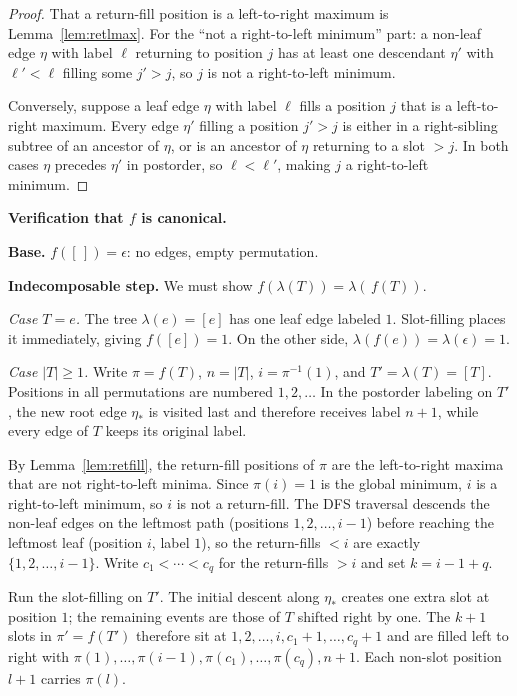 \documentclass[a4paper,11pt]{article}
\theoremstyle{definition}
\begin{document}
\begin{proof}
That a return-fill position is a left-to-right maximum
is Lemma~\ref{lem:retlmax}. For the ``not a
right-to-left minimum'' part: a non-leaf edge $\eta$
with label $\ell$ returning to position $j$ has at
least one descendant $\eta'$ with $\ell' < \ell$
filling some $j' > j$, so $j$ is not a right-to-left
minimum.

Conversely, suppose a leaf edge $\eta$ with label
$\ell$ fills a position $j$ that is a left-to-right
maximum. Every edge $\eta'$ filling a position
$j' > j$ is either in a right-sibling subtree of an
ancestor of $\eta$, or is an ancestor of $\eta$
returning to a slot $> j$. In both cases $\eta$
precedes $\eta'$ in postorder, so $\ell < \ell'$,
making $j$ a right-to-left minimum.
\end{proof}

\textbf{Verification that $f$ is canonical.}

\textbf{Base.}
$f([\,]) = \epsilon$: no edges, empty permutation.

\textbf{Indecomposable step.}
We must show
$f(\lambda(T)) = \lambda(\,f(T))$.

\emph{Case $T = e$.} The tree $\lambda(e) = [e]$ has one
leaf edge labeled $1$. Slot-filling places it
immediately, giving $f([e]) = 1$. On the other side,
$\lambda(f(e)) = \lambda(\epsilon) = 1$.

\emph{Case $|T| \geq 1$.} Write $\pi = f(T)$,
$n = |T|$, $i = \pi^{-1}(1)$, and
$T' = \lambda(T) = [T]$. Positions in all permutations
are numbered $1, 2, \ldots$ In the postorder labeling on
$T'$, the new root edge $\eta_*$ is visited last and
therefore receives label $n{+}1$, while every edge of
$T$ keeps its original label.

By Lemma~\ref{lem:retfill}, the return-fill positions
of $\pi$ are the left-to-right maxima that are not
right-to-left minima. Since $\pi(i) = 1$ is the global
minimum, $i$ is a right-to-left minimum, so $i$ is not
a return-fill. The DFS traversal descends the non-leaf
edges on the leftmost path (positions $1, 2, \ldots,
i{-}1$) before reaching the leftmost leaf (position $i$,
label $1$), so the return-fills $< i$ are exactly
$\{1, 2, \ldots, i{-}1\}$. Write $c_1 < \cdots < c_q$
for the return-fills $> i$ and set $k = i - 1 + q$.

Run the slot-filling on $T'$. The initial descent along
$\eta_*$ creates one extra slot at position $1$; the
remaining events are those of $T$ shifted right by one.
The $k{+}1$ slots in $\pi' = f(T')$ therefore sit at
$1, 2, \ldots, i, c_1{+}1, \ldots, c_q{+}1$ and are
filled left to right with
$\pi(1), \ldots, \pi(i{-}1),
\pi(c_1), \ldots, \pi(c_q), n{+}1$.
Each non-slot position $l{+}1$ carries $\pi(l)$.
\end{document}
